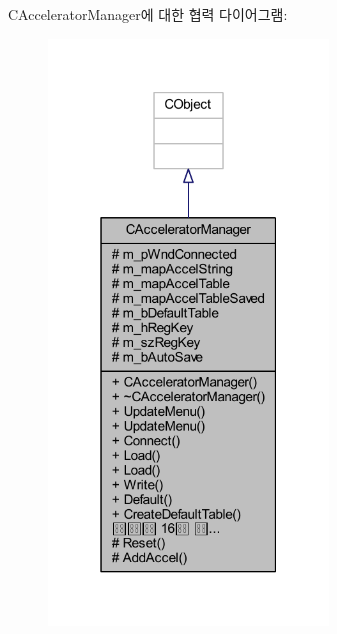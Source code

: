 C\+Accelerator\+Manager에 대한 협력 다이어그램\+:\nopagebreak
\begin{figure}[H]
\begin{center}
\leavevmode
\includegraphics[width=211pt]{class_c_accelerator_manager__coll__graph}
\end{center}
\end{figure}
